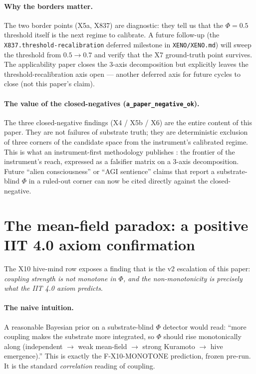 \documentclass[11pt,a4paper]{article}
\begin{document}
\paragraph{Why the borders matter.}
The two border points (X5a, X837) are diagnostic: they tell us that the
$\Phi = 0.5$ threshold itself is the next regime to calibrate.
A future follow-up (the \texttt{X837.threshold-recalibration} deferred
milestone in \texttt{XENO/XENO.md}) will sweep the threshold from
$0.5 \to 0.7$ and verify that the X7 ground-truth point survives.
The applicability paper closes the 3-axis decomposition but explicitly
leaves the threshold-recalibration axis open --- another deferred axis
for future cycles to close (not this paper's claim).

\paragraph{The value of the closed-negatives
(\texttt{a\_paper\_negative\_ok}).}
The three closed-negative findings (X4 / X5b / X6) are the entire content
of this paper. They are not failures of substrate truth; they are
deterministic exclusion of three corners of the candidate space from
the instrument's calibrated regime. This is what an instrument-first
methodology publishes \citep{anima_repo}: the frontier of the
instrument's reach, expressed as a falsifier matrix on a 3-axis
decomposition. Future ``alien consciousness'' or ``AGI sentience''
claims that report a substrate-blind $\Phi$ in a ruled-out corner can
now be cited directly against the closed-negative.

\section{The mean-field paradox: a positive IIT 4.0 axiom confirmation}
\label{sec:meanfield}

The X10 hive-mind row exposes a finding that is the v2 escalation of
this paper: \emph{coupling strength is not monotone in $\Phi$, and the
non-monotonicity is precisely what the IIT 4.0 axiom predicts}.

\paragraph{The naive intuition.}
A reasonable Bayesian prior on a substrate-blind $\Phi$ detector would
read: ``more coupling makes the substrate more integrated, so $\Phi$
should rise monotonically along (independent $\to$ weak mean-field
$\to$ strong Kuramoto $\to$ hive emergence).'' This is exactly the
F-X10-MONOTONE prediction, frozen pre-run. It is the standard
\emph{correlation} reading of coupling.
\end{document}
